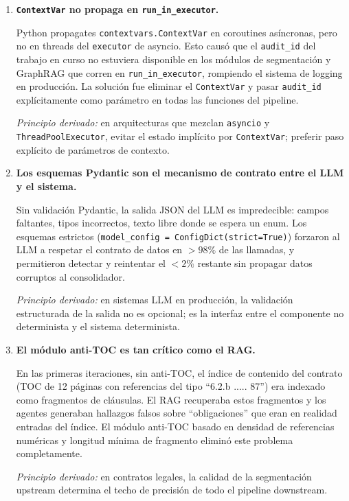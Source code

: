 \begin{enumerate}
    \textit{Principio derivado:} el efecto de GraphRAG no puede evaluarse
    de forma aislada; siempre está mediado por el comportamiento del LLM
    que construye y consume el grafo.

    \item \textbf{\texttt{ContextVar} no propaga en \texttt{run\_in\_executor}.}

    Python propagates \texttt{contextvars.ContextVar} en coroutines
    asíncronas, pero no en threads del \texttt{executor} de asyncio.
    Esto causó que el \texttt{audit\_id} del trabajo en curso no estuviera
    disponible en los módulos de segmentación y GraphRAG que corren en
    \texttt{run\_in\_executor}, rompiendo el sistema de logging en producción.
    La solución fue eliminar el \texttt{ContextVar} y pasar \texttt{audit\_id}
    explícitamente como parámetro en todas las funciones del pipeline.

    \textit{Principio derivado:} en arquitecturas que mezclan \texttt{asyncio}
    y \texttt{ThreadPoolExecutor}, evitar el estado implícito por
    \texttt{ContextVar}; preferir paso explícito de parámetros de contexto.

    \item \textbf{Los esquemas Pydantic son el mecanismo de contrato entre el LLM y el sistema.}

    Sin validación Pydantic, la salida JSON del LLM es impredecible: campos
    faltantes, tipos incorrectos, texto libre donde se espera un enum.
    Los esquemas estrictos (\texttt{model\_config = ConfigDict(strict=True)})
    forzaron al LLM a respetar el contrato de datos en $> 98\%$ de las
    llamadas, y permitieron detectar y reintentar el $< 2\%$ restante
    sin propagar datos corruptos al consolidador.

    \textit{Principio derivado:} en sistemas LLM en producción, la validación
    estructurada de la salida no es opcional; es la interfaz entre el
    componente no determinista y el sistema determinista.

    \item \textbf{El módulo anti-TOC es tan crítico como el RAG.}

    En las primeras iteraciones, sin anti-TOC, el índice de contenido del
    contrato (TOC de 12 páginas con referencias del tipo ``6.2.b ..... 87'')
    era indexado como fragmentos de cláusulas. El RAG recuperaba estos
    fragmentos y los agentes generaban hallazgos falsos sobre ``obligaciones''
    que eran en realidad entradas del índice. El módulo anti-TOC basado en
    densidad de referencias numéricas y longitud mínima de fragmento
    eliminó este problema completamente.

    \textit{Principio derivado:} en contratos legales, la calidad de la
    segmentación upstream determina el techo de precisión de todo el
    pipeline downstream.

\end{enumerate}

